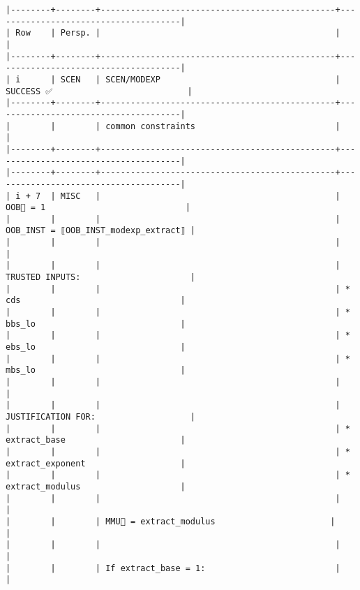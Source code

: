 \documentclass[varwidth=\maxdimen,margin=0.5cm,multi={verbatim}]{standalone}
\begin{document}
\begin{verbatim}
|--------+--------+-----------------------------------------------+--------------------------------------|
| Row    | Persp. |                                               |                                      |
|--------+--------+-----------------------------------------------+--------------------------------------|
| i      | SCEN   | SCEN/MODEXP                                   | SUCCESS ✅                           |
|--------+--------+-----------------------------------------------+--------------------------------------|
|        |        | common constraints                            |                                      |
|--------+--------+-----------------------------------------------+--------------------------------------|
|--------+--------+-----------------------------------------------+--------------------------------------|
| i + 7  | MISC   |                                               | OOB🏴 = 1                            |
|        |        |                                               | OOB_INST = ⟦OOB_INST_modexp_extract⟧ |
|        |        |                                               |                                      |
|        |        |                                               | TRUSTED INPUTS:                      |
|        |        |                                               | * cds                                |
|        |        |                                               | * bbs_lo                             |
|        |        |                                               | * ebs_lo                             |
|        |        |                                               | * mbs_lo                             |
|        |        |                                               |                                      |
|        |        |                                               | JUSTIFICATION FOR:                   |
|        |        |                                               | * extract_base                       |
|        |        |                                               | * extract_exponent                   |
|        |        |                                               | * extract_modulus                    |
|        |        |                                               |                                      |
|        |        | MMU🏴 = extract_modulus                       |                                      |
|        |        |                                               |                                      |
|        |        | If extract_base = 1:                          |                                      |

\end{verbatim}
\end{document}
